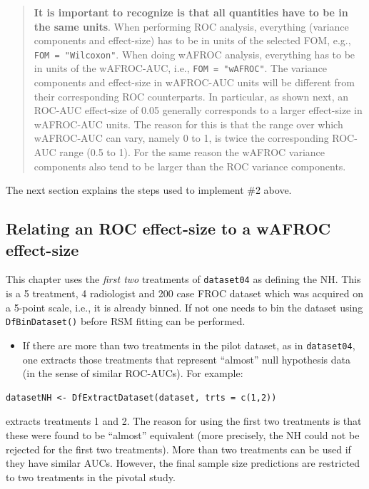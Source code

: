 \documentclass[
]{book}
\providecommand{\tightlist}{%
  \setlength{\itemsep}{0pt}\setlength{\parskip}{0pt}}
\begin{document}
\begin{quote}
\textbf{It is important to recognize is that all quantities have to be in the same units}. When performing ROC analysis, everything (variance components and effect-size) has to be in units of the selected FOM, e.g., \texttt{FOM\ =\ "Wilcoxon"}. When doing wAFROC analysis, everything has to be in units of the wAFROC-AUC, i.e., \texttt{FOM\ =\ "wAFROC"}. The variance components and effect-size in wAFROC-AUC units will be different from their corresponding ROC counterparts. In particular, as shown next, an ROC-AUC effect-size of 0.05 generally corresponds to a larger effect-size in wAFROC-AUC units. The reason for this is that the range over which wAFROC-AUC can vary, namely 0 to 1, is twice the corresponding ROC-AUC range (0.5 to 1). For the same reason the wAFROC variance components also tend to be larger than the ROC variance components.
\end{quote}

The next section explains the steps used to implement \#2 above.

\hypertarget{relating-an-roc-effect-size-to-a-wafroc-effect-size}{%
\subsection{Relating an ROC effect-size to a wAFROC effect-size}\label{relating-an-roc-effect-size-to-a-wafroc-effect-size}}

This chapter uses the \emph{first two} treatments of \texttt{dataset04} as defining the NH. This is a 5 treatment, 4 radiologist and 200 case FROC dataset \citep{zanca2009evaluation} which was acquired on a 5-point scale, i.e., it is already binned. If not one needs to bin the dataset using \texttt{DfBinDataset()} before RSM fitting can be performed.

\begin{itemize}
\tightlist
\item
  If there are more than two treatments in the pilot dataset, as in \texttt{dataset04}, one extracts those treatments that represent ``almost'' null hypothesis data (in the sense of similar ROC-AUCs). For example:
\end{itemize}

\begin{verbatim}
datasetNH <- DfExtractDataset(dataset, trts = c(1,2)) 
\end{verbatim}

extracts treatments 1 and 2. The reason for using the first two treatments is that these were found \citep{zanca2009evaluation} to be ``almost'' equivalent (more precisely, the NH could not be rejected for the first two treatments). More than two treatments can be used if they have similar AUCs. However, the final sample size predictions are restricted to two treatments in the pivotal study.
\end{document}
